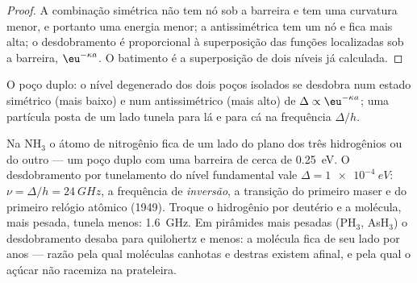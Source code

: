 \begin{proof}
A combinação simétrica não tem nó sob a barreira e tem uma curvatura
menor, e portanto uma energia menor; a antissimétrica tem um nó e
fica mais alta; o desdobramento é proporcional à superposição das
funções localizadas sob a barreira, $\eu^{-\kappa a}$. O batimento é
a superposição de dois níveis já calculada.
\end{proof}

\begin{omfigure}

{\small O poço duplo: o nível degenerado dos dois poços isolados
se desdobra num estado simétrico (mais baixo) e num antissimétrico
(mais alto) de $\Delta \propto \eu^{-\kappa a}$; uma partícula posta de um lado
tunela para lá e para cá na frequência $\Delta/h$.}
\end{omfigure}

\begin{example}[A amônia]\label{ex:b2:potential-wells-tunneling:ammonia}
Na NH$_3$ o átomo de nitrogênio fica de um lado do plano dos três
hidrogênios ou do outro --- um poço duplo com uma barreira de cerca de
\qty{0.25}{eV}. O desdobramento por tunelamento do nível fundamental vale $\Delta =
\qty{1e-4}{eV}$: $\nu = \Delta/h = \qty{24}{GHz}$, a frequência de
\emph{inversão}, a transição do primeiro maser e do primeiro relógio
atômico (1949). Troque o hidrogênio por deutério e a molécula, mais pesada,
tunela menos: \qty{1.6}{GHz}. Em pirâmides mais pesadas (PH$_3$, AsH$_3$) o
desdobramento desaba para quilohertz e menos: a molécula fica de seu
lado por anos --- razão pela qual moléculas canhotas e destras existem
afinal, e pela qual o açúcar não racemiza na prateleira.
\end{example}

